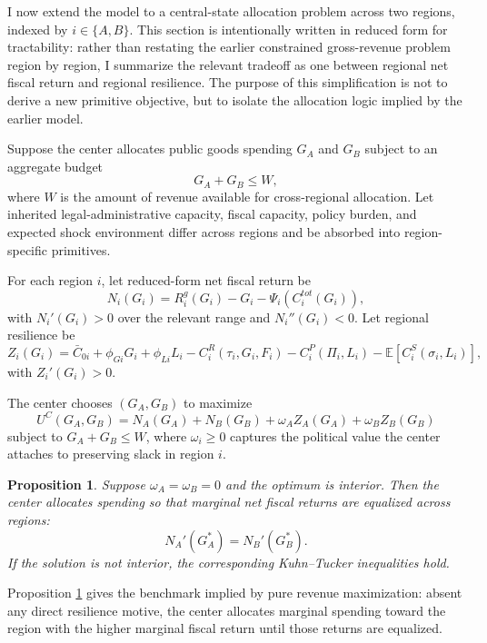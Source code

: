 \documentclass[12pt]{article}
\newtheorem{proposition}{Proposition}
\newcommand{\E}{\mathbb{E}}
\begin{document}
I now extend the model to a central-state allocation problem across two regions, indexed by $i\in\{A,B\}$. This section is intentionally written in reduced form for tractability: rather than restating the earlier constrained gross-revenue problem region by region, I summarize the relevant tradeoff as one between regional net fiscal return and regional resilience. The purpose of this simplification is not to derive a new primitive objective, but to isolate the allocation logic implied by the earlier model.

Suppose the center allocates public goods spending $G_A$ and $G_B$ subject to an aggregate budget
\begin{equation}
G_A + G_B \le W,
\end{equation}
where $W$ is the amount of revenue available for cross-regional allocation. Let inherited legal-administrative capacity, fiscal capacity, policy burden, and expected shock environment differ across regions and be absorbed into region-specific primitives.

For each region $i$, let reduced-form net fiscal return be
\begin{equation}
N_i(G_i) = R_i^g(G_i) - G_i - \Psi_i(C_i^{tot}(G_i)),
\end{equation}
with $N_i'(G_i)>0$ over the relevant range and $N_i''(G_i)<0$. Let regional resilience be
\begin{equation}
Z_i(G_i) = \bar C_{0i} + \phi_{Gi}G_i + \phi_{Li}L_i - C_i^R(\tau_i,G_i,F_i) - C_i^P(\Pi_i,L_i) - \E[C_i^S(\sigma_i,L_i)],
\end{equation}
with $Z_i'(G_i)>0$.

The center chooses $(G_A,G_B)$ to maximize
\begin{equation}
U^C(G_A,G_B) = N_A(G_A)+N_B(G_B)+\omega_A Z_A(G_A)+\omega_B Z_B(G_B)
\end{equation}
subject to $G_A+G_B\le W$, where $\omega_i\ge 0$ captures the political value the center attaches to preserving slack in region $i$.

\begin{proposition}\label{prop:tworegion_revenue_only}
Suppose $\omega_A=\omega_B=0$ and the optimum is interior. Then the center allocates spending so that marginal net fiscal returns are equalized across regions:
\[
N_A'(G_A^*) = N_B'(G_B^*).
\]
If the solution is not interior, the corresponding Kuhn--Tucker inequalities hold.
\end{proposition}

Proposition \ref{prop:tworegion_revenue_only} gives the benchmark implied by pure revenue maximization: absent any direct resilience motive, the center allocates marginal spending toward the region with the higher marginal fiscal return until those returns are equalized.
\end{document}
